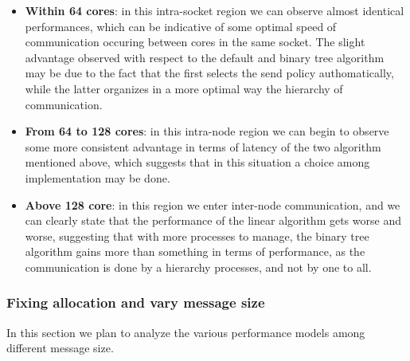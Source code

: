 \documentclass{article}
\begin{document}
	\begin{itemize}
		\item \textbf{Within 64 cores}: in this intra-socket region we can observe almost identical performances, which can be indicative of some optimal speed of communication occuring between cores in the same socket. The slight advantage observed with respect to the default and binary tree algorithm may be due to the fact that the first selects the send policy authomatically, while the latter organizes in a more optimal way the hierarchy of communication.\\
		\item \textbf{From 64 to 128 cores}: in this intra-node region we can begin to observe some more consistent advantage in terms of latency of the two algorithm mentioned above, which suggests that in this situation a choice among implementation may be done.
		\item \textbf{Above 128 core}: in this region we enter inter-node communication, and we can clearly state that the performance of the linear algorithm gets worse and worse, suggesting that with more processes to manage, the binary tree algorithm gains more than something in terms of performance, as the communication is done by a hierarchy processes, and not by one to all.
	\end{itemize}

	\subsubsection{Fixing allocation and vary message size}
	
	In this section we plan to analyze the various performance models among different message size.
	
\end{document}
